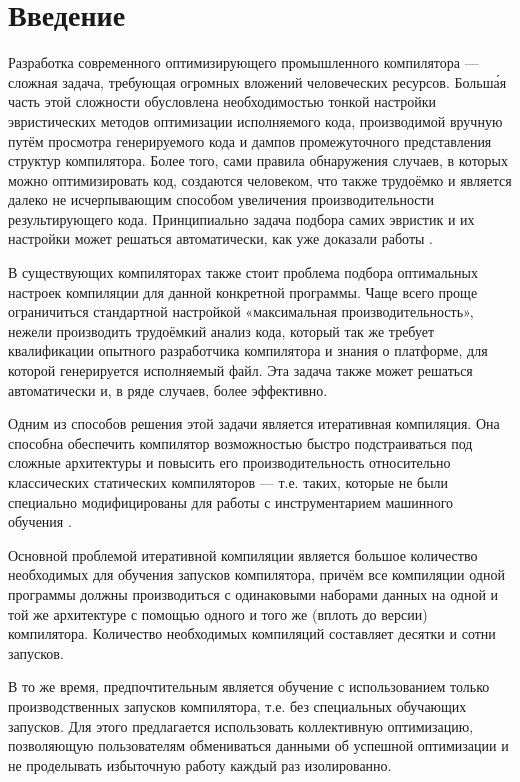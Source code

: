 \section{Введение}
Разработка современного оптимизирующего промышленного компилятора --- сложная задача, требующая огромных вложений человеческих ресурсов. Больш\'{а}я часть этой сложности обусловлена необходимостью тонкой настройки эвристических методов оптимизации исполняемого кода, производимой вручную путём просмотра генерируемого кода и дампов промежуточного представления структур компилятора. Более того, сами правила обнаружения случаев, в которых можно оптимизировать код, создаются человеком, что также трудоёмко и является далеко не исчерпывающим способом увеличения производительности результирующего кода. Принципиально задача подбора самих эвристик и их настройки может решаться автоматически, как уже доказали работы \cite{Agakov:2006:UML:1121992.1122412,Bodin98iterativecompilation,FCA2007,Cooper:2005:AAC:1065910.1065921}.

В существующих компиляторах также стоит проблема подбора оптимальных настроек компиляции для данной конкретной программы. Чаще всего проще ограничиться стандартной настройкой «максимальная производительность», нежели производить трудоёмкий анализ кода, который так же требует квалификации опытного разработчика компилятора и знания о платформе, для которой генерируется исполняемый файл. Эта задача также может решаться автоматически и, в ряде случаев, более эффективно.

Одним из способов решения этой задачи является итеративная компиляция. Она способна обеспечить компилятор возможностью быстро подстраиваться под сложные архитектуры и повысить его производительность относительно классических статических компиляторов — т.е. таких, которые не были специально модифицированы для работы с инструментарием машинного обучения \cite{Dubach:2009:PCO:1669112.1669124,Dubach:2008:EPA:1450095.1450103}.

Основной проблемой итеративной компиляции является большое количество необходимых для обучения запусков компилятора, причём все компиляции одной программы должны производиться с одинаковыми наборами данных на одной и той же архитектуре с помощью одного и того же (вплоть до версии) компилятора. Количество необходимых компиляций составляет десятки и сотни запусков.

В то же время, предпочтительным является обучение с использованием только производственных запусков компилятора, т.е. без специальных обучающих запусков. Для этого предлагается использовать коллективную оптимизацию, позволяющую пользователям обмениваться данными об успешной оптимизации и не проделывать избыточную работу каждый раз изолированно.

